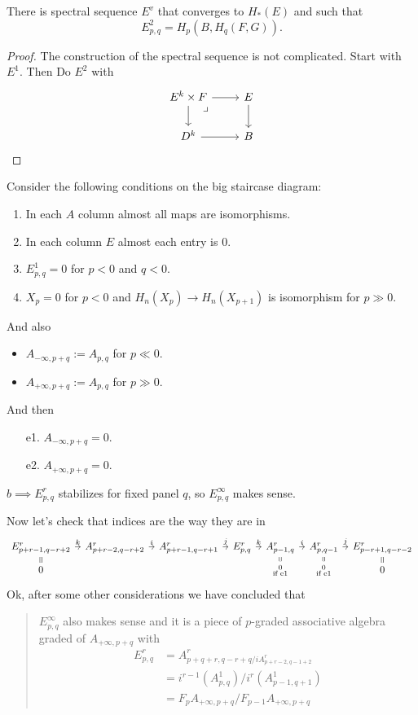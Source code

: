 \documentclass{article}
\begin{document}
\begin{thm}
	There is spectral sequence $E^v$ that converges to $H_*(E)$ and such that
	\[E^2_{p,q}=H_p(B,H_q(F,G)).\]
\end{thm}
\begin{proof}
	The construction of the spectral sequence is not complicated. Start with $E^1$. Then Do $E^2$ with
	\[\begin{tikzcd}
		E^k\times F\arrow[r]\arrow[d]\arrow[dr,phantom,very near start,"\lrcorner"]&E\arrow[d]\\
		D^k\arrow[r]&B
	\end{tikzcd}\]
\end{proof}
	Consider the following conditions on the big staircase diagram:
	\begin{enumerate}[label*=\alph*.]
		\item In each $A$ column almost all maps are isomorphisms.
		\item In each column $E$ almost each entry is 0.
		\item $E^1_{p,q}=0$ for $p<0$ and $q<0$.
		\item $X_p=0$ for $p<0$ and $H_n(X_p)\to H_n(X_{p+1})$ is isomorphism for $p\gg0$.
	\end{enumerate}
	And also
	\begin{itemize}
		\item $A_{-\infty,p+q}:=A_{p,q}$ for $p\ll0$.
		\item $A_{+\infty,p+q}:=A_{p,q}$ for $p\gg0$.
	\end{itemize}
	And then
	\begin{enumerate}
		\item[e1.] $A_{-\infty,p+q}=0$.
		\item[e2.] $A_{+\infty,p+q}=0$.
	\end{enumerate}
\begin{claim}
	$b\implies E^r_{p,q}$ stabilizes for fixed panel $q$, so $E^\infty_{p,q}$ makes sense.
\end{claim}
Now let's check that indices are the way they are in
\[\begin{tikzcd}[column sep=tiny,row sep=tiny]
	E^r_{p+r-1,q-r+2}\arrow[r,"k"]\arrow[d,equal]&A^r_{p+r-2,q-r+2}\arrow[r,"i"]&A^r_{p+r-1,q-r+1}\arrow[r,"j"]&E^r_{p,q}\arrow[r,"k"]&A_{p-1,q}^r\arrow[r,"i"]\arrow[d,equal]&A^r_{p,q-1}\arrow[r,"j"]\arrow[d,equal]&E^r_{p-r+1,q-r-2}\arrow[d,equal]\\
	0&&&&\substack{0\\\text{if e1}}&\substack{0\\\text{if e1}}&0
\end{tikzcd}\]
Ok, after some other considerations we have concluded that
\begin{quotation}
	$E^\infty_{p,q}$ also makes sense and it is a piece of $p$-graded associative algebra graded of $A_{+\infty,p+q}$ with
	\begin{align*}
		E^r_{p,q}&=A^r_{p+q+r,q-r+q/iA^r_{p+r-2,q-1+2}}\\
		&=i^{r-1}(A^1_{p,q})/i^r(A^1_{p-1,q+1})\\
		&=F_pA_{+\infty,p+q}/F_{p-1}A_{+\infty,p+q}
	\end{align*}
\end{quotation}
\end{document}
